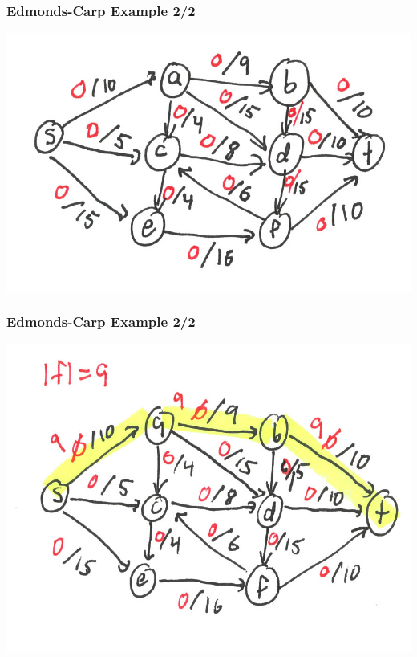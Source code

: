 \documentclass[10pt,aspectratio=169]{beamer}
\begin{document}
\begin{frame} \frametitle{Edmonds-Carp Example 2/2}
\begin{center}
  \includegraphics[scale=1]{ek-2-1.png}
\end{center}
\end{frame}

\begin{frame} \frametitle{Edmonds-Carp Example 2/2}
\begin{center}
  \includegraphics[scale=1]{ek-2-2.png}
\end{center}
\end{frame}
\end{document}
